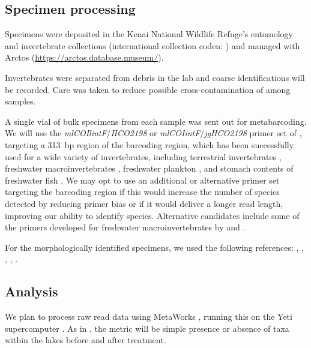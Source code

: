 \begin{multicols}{2}


\subsection{Specimen processing}

Specimens were deposited in the Kenai National Wildlife Refuge's entomology and invertebrate collections (international collection coden: ) and managed with Arctos (\url{https://arctos.database.museum/}).

Invertebrates were separated from debris in the lab and coarse identifications will be recorded. Care was taken to reduce possible cross-contamination of  among samples.

A single vial of bulk specimens from each sample was sent out for metabarcoding. We will use the \textit{mlCOIlintF}/\textit{HCO2198} or \textit{mlCOIintF}/\textit{jgHCO2198} primer set of \citet{Lerayetal2013}, targeting a 313~bp region of the   barcoding region, which has been successfully used for a wide variety of invertebrates, including terrestrial invertebrates \citep{Bowseretal2020}, freshwater macroinvertebrates \citep{Hajibabaeietal2019}, freshwater plankton \citep{Yangetal2017}, and stomach contents of freshwater fish \citep{BowserBowser2020}. We may opt to use an additional or alternative primer set targeting the   barcoding region if this would increase the number of species detected by reducing primer bias or if it would deliver a longer read length, improving our ability to identify species. Alternative candidates include some of the primers developed for freshwater macroinvertebrates by \citet{ElbrechtLeese2017} and \citet{Vamosetal2017}.

For the morphologically identified specimens, we used the following references: \cite{Durfee2005}, \cite{Hatch1953}, \citet{Kenner2009}, \citet{Roughley2000}, \citet{Wallis1933}.

\subsection{Analysis}

We plan to process raw read data using MetaWorks \citep{PorterHajibabaei2020}, running this on the Yeti supercomputer \citep{USGSARC2021}. As in \citet{Massengill2014, Massengill2017}, the metric will be simple presence or absence of taxa within the lakes before and after treatment.



\end{multicols}

